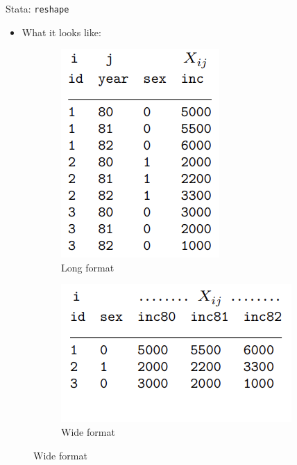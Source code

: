 \documentclass[11pt,notes=hide,aspectratio=169,mathserif]{beamer}
\begin{document}
\begin{frame}{Stata: \texttt{reshape}}
\begin{itemize}
\item What it looks like:
\end{itemize}
\begin{figure}[htbp]
\centering
\begin{subfigure}{0.25\textwidth}
\includegraphics[width=\textwidth]{inputs/reshape1.png}
\caption{Long format}
\end{subfigure}
\hfill
\begin{subfigure}{0.45\textwidth}
\includegraphics[width=\textwidth]{inputs/reshape2.png}
\caption{Wide format}
\end{subfigure}
\end{figure}
\end{frame}
    
\end{document}
